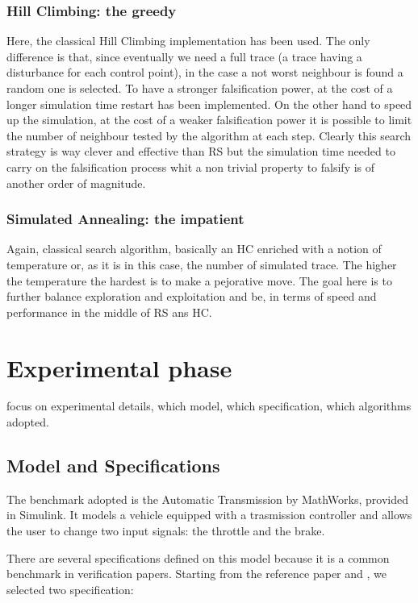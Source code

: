 \documentclass[11pt]{article}
\begin{document}
\subsubsection{Hill Climbing: the greedy}
Here, the classical Hill Climbing implementation has been used. The only difference is that, since eventually we need a full trace (a trace having a disturbance for each control point), in the case a not worst neighbour is found a random one is selected. To have a stronger falsification power, at the cost of a longer simulation time restart has been implemented. On the other hand to speed up the simulation, at the cost of a weaker falsification power it is possible to limit the number of
neighbour tested by the algorithm at each step. 
Clearly this search strategy is way clever and effective than RS but the simulation time needed to carry on the falsification process whit a non trivial property to falsify is of another order of magnitude.

\subsubsection{Simulated Annealing: the impatient}
Again, classical search algorithm, basically an HC enriched with a notion of temperature or, as it is in this case, the number of simulated trace. The higher the temperature the hardest is to make a pejorative move. 
The goal here is to further balance exploration and exploitation and be, in terms of speed and performance in the middle of RS ans HC.
\pagebreak

\section{Experimental phase}
focus on experimental details, which model, which specification, which algorithms adopted.

\subsection{Model and Specifications}
The benchmark adopted is the Automatic Transmission by MathWorks, provided in Simulink. It models a vehicle equipped with a trasmission controller and allows the user to change two input signals: the     throttle and the brake.

There are several specifications defined on this model because it is a common benchmark in verification papers. Starting from the reference paper and \cite{bardh2014benchmarks}, we selected two           specification:
\end{document}
